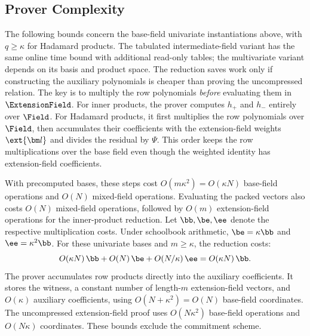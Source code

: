 \subsection{Prover Complexity}
\label{sec:highLevelEfficiency}

The following bounds concern the base-field univariate
instantiations above, with \(q\geq\kappa\) for Hadamard products.
The tabulated intermediate-field variant has the same online
time bound with additional read-only tables; the multivariate
variant depends on its basis and product space.
The reduction saves work only if constructing the auxiliary
polynomials is cheaper than proving the uncompressed relation.
The key is to multiply the row polynomials \emph{before} evaluating
them in \(\ExtensionField\).
For inner products, the prover computes \(h_+\) and
\(h_-\) entirely over \(\Field\).
For Hadamard products, it first multiplies the row polynomials over
\(\Field\), then accumulates their coefficients with the
extension-field weights \(\ext{\bm l}\) and divides the residual
by \(\Psi\).
This order keeps the row multiplications over the base field even
though the weighted identity has extension-field coefficients.

With precomputed bases, these steps cost
\(O(m\kappa^2)=O(\kappa N)\) base-field operations and \(O(N)\)
mixed-field operations. Evaluating the packed vectors also costs
\(O(N)\) mixed-field operations, followed by \(O(m)\) extension-field
operations for the inner-product reduction.
Let \(\bb,\be,\ee\) denote the respective multiplication costs.
Under schoolbook arithmetic,
\(\be=\kappa\bb\) and \(\ee=\kappa^2\bb\).
For these univariate bases and \(m\geq\kappa\), the reduction costs:
\[
    O(\kappa N)\,\bb+O(N)\,\be+O(N/\kappa)\,\ee
    =O(\kappa N)\,\bb.
\]
The prover accumulates row products directly into the auxiliary
coefficients. It stores the witness, a constant number of
length-\(m\) extension-field vectors, and \(O(\kappa)\) auxiliary
coefficients, using \(O(N+\kappa^2)=O(N)\) base-field coordinates.
The uncompressed extension-field proof uses
\(O(N\kappa^2)\) base-field operations and \(O(N\kappa)\) coordinates.
These bounds exclude the commitment scheme.
